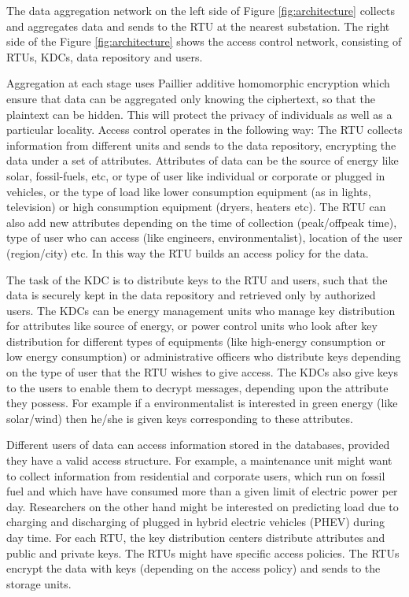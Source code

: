 \documentclass[conference]{IEEEtran}[10pt]
\begin{document}
The data aggregation network  on the left side of Figure \ref{fig:architecture} collects and aggregates data and sends to the RTU at the 
nearest substation. 
The right side of the Figure \ref{fig:architecture} shows the access control network, consisting of
RTUs, KDCs, data repository and users. 

Aggregation at each stage uses Paillier additive homomorphic encryption \cite{P99} which ensure that data can be aggregated only knowing the ciphertext, 
so that the plaintext can be hidden. 
This will protect the privacy of  individuals as well as a particular locality. 
Access control operates in the following way:
The RTU collects information from different units and sends to the data repository, encrypting the data under a set of  attributes.
Attributes of data can be the source of energy like solar, fossil-fuels, etc, or type of user like individual or corporate or plugged in vehicles, 
or the type of load like lower consumption equipment (as in lights, television) or high consumption equipment (dryers, heaters etc). 
The RTU can also add new attributes depending on the
time of collection (peak/offpeak time), type of user who can access (like engineers, environmentalist), location of the user (region/city) etc.
In this way the RTU builds an access policy for the data. 

The task of the KDC is to distribute keys to the RTU and users, such that the data is securely kept in the data repository and
retrieved only by authorized users. 
The KDCs can be energy management units who manage key distribution for attributes like source of energy, 
or power control units who look after key distribution for different types of equipments (like high-energy consumption or low energy consumption)
or administrative officers who distribute keys depending on the type of user that the RTU wishes to give access.
The KDCs also give keys to the users to enable them to decrypt messages, depending upon the attribute
they possess. 
For example if a environmentalist is interested in green energy (like solar/wind) then he/she is given keys corresponding to these attributes. 

Different users of data can access information stored in the databases, provided they have a valid access structure.
For example, a maintenance unit might want to collect information from residential and corporate users, which run on fossil fuel and
which have have consumed more than a given limit of electric power per day. 
Researchers on the other hand might be interested on predicting load due to charging and discharging of plugged in hybrid electric vehicles (PHEV)
during day time.
For each RTU, the key distribution centers distribute attributes and public and private keys.
The RTUs might have specific access policies. 
The RTUs encrypt the data with keys (depending on the access policy)  and sends to the storage units.
\end{document}
